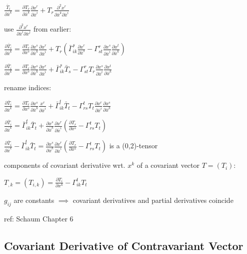 \documentclass[8pt,letter]{article}
\begin{document}
\begin{multicols*}{2}
  $\frac{\bar{T}_i}{\partial \bar{x}^k} = \frac{\partial T_r}{\partial \bar{x}^k} \frac{\partial x^r}{\partial \bar{x}^i} + T_r \frac{\partial^2 x^r}{\partial \bar{x}^k \partial \bar{x}^i}$

  use $\frac{\partial^2 x^r}{\partial \bar{x}^i \partial \bar{x}^j}$ from earlier:

  $\frac{\partial \bar{T}_i}{\partial \bar{x}^k} = \frac{\partial T_r}{\partial x^s} \frac{\partial x^s}{\partial \bar{x}^k} \frac{\partial x^r}{\partial \bar{x}^i} + T_r \left( \bar{\Gamma}_{ik}^s \frac{\partial x^r}{\partial \bar{x}^s} - \Gamma_{st}^r \frac{\partial x^s}{\partial \bar{x}^i} \frac{\partial x^t}{\partial \bar{x}^k} \right)$

  $\frac{\partial \bar{T}_i}{\partial \bar{x}^k} = \frac{\partial T_r}{\partial x^s} \frac{\partial x^s}{\partial \bar{x}^k} \frac{\partial x^r}{\partial \bar{x}^i} + \bar{\Gamma}_{ik}^s \bar{T}_s - \Gamma_{st}^r T_r \frac{\partial x^s}{\partial \bar{x}^i} \frac{\partial x^t}{\partial \bar{x}^k}$

  rename indices:

  $\frac{\partial \bar{T}_i}{\partial \bar{x}^k} = \frac{\partial T_r}{\partial x^s} \frac{\partial x^s}{\partial \bar{x}^k} \frac{x^r}{\partial \bar{x}^i} + \bar{\Gamma}_{ik}^t \bar{T}_t - \Gamma_{rs}^t T_t \frac{\partial x^r}{\partial \bar{x}^i} \frac{\partial x^s}{\partial \bar{x}^k}$

  $\frac{\partial \bar{T}_i}{\partial \bar{x}^k} = \bar{\Gamma}_{ik}^t \bar{T}_t + \frac{\partial x^s}{\partial \bar{x}^k} \frac{\partial x^r}{\partial \bar{x}^i} \left( \frac{\partial T_r}{\partial x^s} - \Gamma_{rs}^t T_t \right)$

  $\frac{\partial \bar{T}_i}{\partial \bar{x}^k} - \bar{\Gamma}_{ik}^t \bar{T}_t = \frac{\partial x^s}{\partial \bar{x}^k} \frac{\partial x^r}{\partial \bar{x}^i} \left( \frac{\partial T_r}{\partial x^s} - \Gamma_{rs}^t T_t \right)$ is a (0,2)-tensor

  components of covariant derivative wrt. $x^k$ of a covariant vector $T=(T_i)$:

  $T_{,k} = (T_{i,k}) = \frac{\partial T_i}{\partial x^k} - \Gamma_{ik}^t T_t$

  $g_{ij}$ are constants $\implies$ covariant derivatives and partial derivatives coincide

  ref: Schaum Chapter 6

  \subsection{Covariant Derivative of Contravariant Vector}
  

\end{multicols*}
\end{document}
